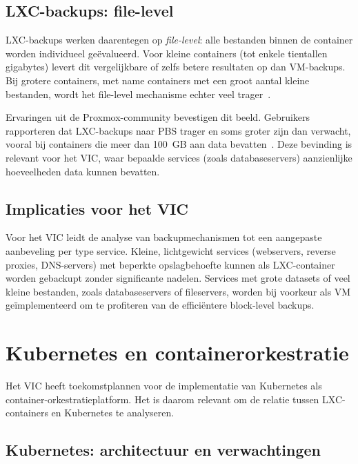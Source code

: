 \subsection{LXC-backups: file-level}
\label{subsec:lxc-backups}

LXC-backups werken daarentegen op \textit{file-level}: alle bestanden binnen de container worden individueel geëvalueerd. Voor kleine containers (tot enkele tientallen gigabytes) levert dit vergelijkbare of zelfs betere resultaten op dan VM-backups. Bij grotere containers, met name containers met een groot aantal kleine bestanden, wordt het file-level mechanisme echter veel trager~\autocite{ProxmoxForum2021, ProxmoxForum2024}.

Ervaringen uit de Proxmox-community bevestigen dit beeld. Gebruikers rapporteren dat LXC-backups naar PBS trager en soms groter zijn dan verwacht, vooral bij containers die meer dan 100~GB aan data bevatten~\autocite{ProxmoxForum2025}. Deze bevinding is relevant voor het VIC, waar bepaalde services (zoals databaseservers) aanzienlijke hoeveelheden data kunnen bevatten.

\subsection{Implicaties voor het VIC}
\label{subsec:backup-implicaties}

Voor het VIC leidt de analyse van backupmechanismen tot een aangepaste aanbeveling per type service. Kleine, lichtgewicht services (webservers, reverse proxies, DNS-servers) met beperkte opslagbehoefte kunnen als LXC-container worden gebackupt zonder significante nadelen. Services met grote datasets of veel kleine bestanden, zoals databaseservers of fileservers, worden bij voorkeur als VM geïmplementeerd om te profiteren van de efficiëntere block-level backups.

\section{Kubernetes en containerorkestratie}
\label{sec:kubernetes-orkestratie}

Het VIC heeft toekomstplannen voor de implementatie van Kubernetes als container-orkestratieplatform. Het is daarom relevant om de relatie tussen LXC-containers en Kubernetes te analyseren.

\subsection{Kubernetes: architectuur en verwachtingen}
\label{subsec:kubernetes-architectuur}

